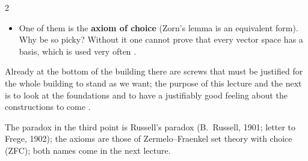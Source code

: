 \begin{paracol}{2}
\begin{itemize}
        on which all of modern mathematics is built .
  \item One of them is the \textbf{axiom of choice} (Zorn's lemma is an equivalent form). Why be so picky? Without
        it one cannot prove that every vector space has a basis, which is used very often
        .
\end{itemize}
Already at the bottom of the building there are screws that must be justified for the whole building to stand as
we want; the purpose of this lecture and the next is to look at the foundations and to have a justifiably good
feeling about the constructions to come .

\begin{coursenote}
The paradox in the third point is Russell's paradox (B.~Russell, 1901; letter to Frege, 1902); the axioms are those
of Zermelo--Fraenkel set theory with choice (ZFC); both names come in the next lecture.
\end{coursenote}


\end{paracol}
